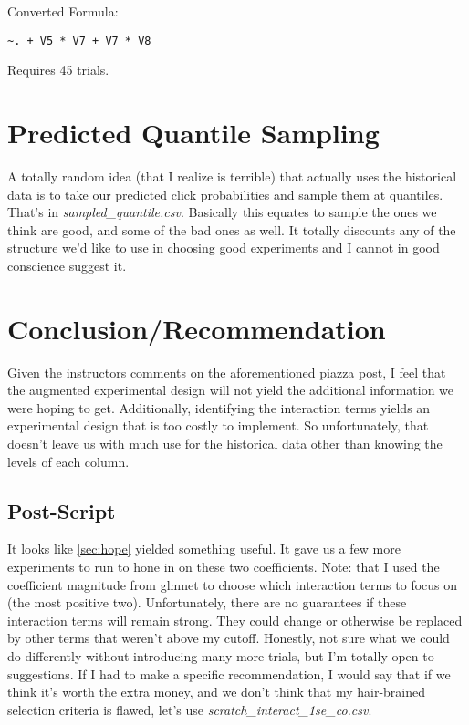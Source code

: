 Converted Formula:
\begin{verbatim}
~. + V5 * V7 + V7 * V8
\end{verbatim}

Requires 45 trials.

\section{Predicted Quantile Sampling}
A totally random idea (that I realize is terrible) that actually uses the historical data is to take our predicted click probabilities and sample them at  quantiles.  That's in \textit{sampled\_quantile.csv}.  Basically this equates to sample the ones we think are good, and some of the bad ones as well.  It totally discounts any of the structure we'd like to use in choosing good experiments and I cannot in good conscience suggest it.

\section{Conclusion/Recommendation}
Given the instructors comments on the aforementioned piazza post, I feel that the augmented experimental design will not yield the additional information we were hoping to get.  Additionally, identifying the interaction terms yields an experimental design that is too costly to implement.  So unfortunately, that doesn't leave us with much use for the historical data other than knowing the levels of each column.  

\subsection{Post-Script}
It looks like \vref{sec:hope} yielded something useful.  It gave us a few more experiments to run to hone in on these two coefficients.  Note: that I used the coefficient magnitude from glmnet to choose which interaction terms to focus on (the most positive two).  Unfortunately, there are no guarantees if these interaction terms will remain strong.  They could change or otherwise be replaced by other terms that weren't above my cutoff.  Honestly, not sure what we could do differently without introducing many more trials, but I'm totally open to suggestions.  If I had to make a specific recommendation, I would say that if we think it's worth the extra money, and we don't think that my hair-brained selection criteria is flawed, let's use \textit{scratch\_interact\_1se\_co.csv}.



